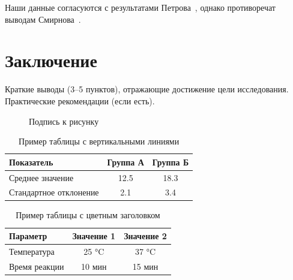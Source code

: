 \documentclass[12pt]{article}
\begin{document}
Наши данные согласуются с результатами Петрова~\cite{petrov2019}, однако противоречат выводам Смирнова~\cite{smirnov2021}.

\section*{Заключение}
Краткие выводы (3–5 пунктов), отражающие достижение цели исследования. Практические рекомендации (если есть).

\printbibliography[title={Список литературы}]

\begin{figure}[ht]
\centering
{}
\caption{Подпись к рисунку}
\end{figure}

%
\begin{table}[ht]
\centering
\caption{Пример таблицы с вертикальными линиями}
\begin{tabular}{|l|c|c|}
\hline
\textbf{Показатель} & \textbf{Группа А} & \textbf{Группа Б} \\
\hline
Среднее значение    & 12.5             & 18.3             \\
Стандартное отклонение & 2.1           & 3.4              \\
\hline
\end{tabular}
\end{table}

\begin{table}[ht]
\caption{Пример таблицы с цветным заголовком}
\begin{tabular}{|l|c|c|}
\hline
\rowcolor{yellow}
\textbf{Параметр} & \textbf{Значение 1} & \textbf{Значение 2} \\
\hline
Температура       & 25 °C              & 37 °C              \\
Время реакции     & 10 мин             & 15 мин             \\
\hline
\end{tabular}
\end{table}
\end{document}
